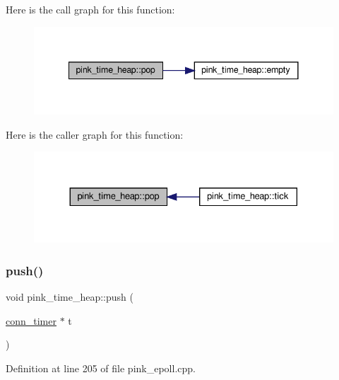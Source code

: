Here is the call graph for this function\+:
\nopagebreak
\begin{figure}[H]
\begin{center}
\leavevmode
\includegraphics[width=341pt]{classpink__time__heap_a5642ee3340cdee7983ed63770e7109d1_cgraph}
\end{center}
\end{figure}
Here is the caller graph for this function\+:
\nopagebreak
\begin{figure}[H]
\begin{center}
\leavevmode
\includegraphics[width=330pt]{classpink__time__heap_a5642ee3340cdee7983ed63770e7109d1_icgraph}
\end{center}
\end{figure}
\mbox{\label{classpink__time__heap_aa74cc12fe4a94acbe75b70a3962a862f}} 
\subsubsection{\texorpdfstring{push()}{push()}}
{\footnotesize\ttfamily void pink\+\_\+time\+\_\+heap\+::push (\begin{DoxyParamCaption}\item[{\hyperlink{classconn__timer}{conn\+\_\+timer} $\ast$}]{t }\end{DoxyParamCaption})}



Definition at line 205 of file pink\+\_\+epoll.\+cpp.

\mbox{\label{classpink__time__heap_a9193dc948c6bb00005bf6639f2169b57}} 
